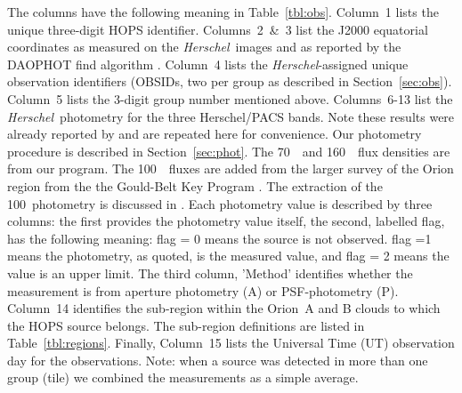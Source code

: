 \documentclass[manuscript]{aastex61}
\newcommand{\herschel}{{\em Herschel}}
\begin{document}
The columns have the following meaning in Table~\ref{tbl:obs}.  Column~1 lists the unique three-digit HOPS identifier.  Columns~2~\&~3 list the J2000 equatorial coordinates as measured on the \herschel\ images and as reported by the DAOPHOT find algorithm \citep{psfphotometry}.  Column~4 lists the \herschel-assigned unique observation identifiers (OBSIDs, two per group as described in Section~\ref{sec:obs}).  Column~5 lists the 3-digit group number mentioned above.  Columns~6-13 list the \herschel\ photometry for the three Herschel/PACS bands.  Note these results were already reported by \cite{furlan} and are repeated here for convenience.  Our photometry procedure is described in Section~\ref{sec:phot}.  The 70~\micron\ and 160~\micron\ flux densities are from our program.  The 100~\micron\ fluxes are added from the larger survey of the Orion region from the the Gould-Belt Key Program \citep{gb}.  The extraction of the 100\micron\ photometry is discussed in \cite{pbrpaper}.  Each photometry value is described by three columns: the first provides the photometry value itself, the second, labelled flag, has the following meaning:   flag = 0 means the source is not observed. flag =1 means the photometry, as quoted, is the measured value,  and flag = 2 means the value is an upper limit.  The third column, 'Method' identifies whether the measurement is from aperture photometry (A) or PSF-photometry (P).  Column~14 identifies the sub-region within the Orion~A and B clouds to which the HOPS source belongs.  The sub-region definitions are listed in Table~\ref{tbl:regions}.  Finally, Column~15 lists the Universal Time (UT) observation day for the observations.  Note: when a source was detected in more than one group (tile) we combined the measurements as a simple average.
\end{document}
